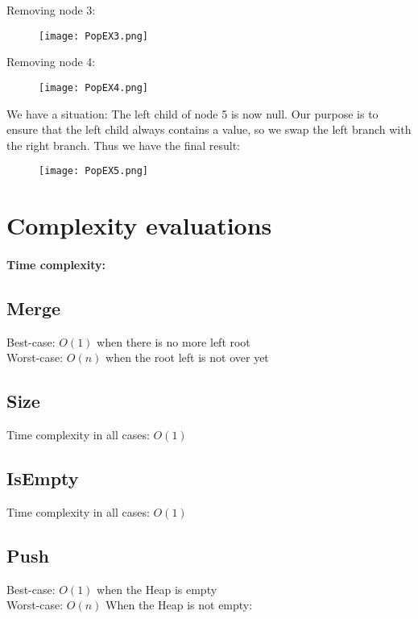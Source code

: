 \documentclass[12pt, a4paper]{article}
\newcommand\tab[1][0.5cm]{\hspace*{#1}}
\begin{document}
Removing node 3:
\begin{figure}[H]
    \begin{center}
        \texttt{[image: PopEX3.png]}
    \end{center}
\end{figure}
Removing node 4:
\begin{figure}[H]
    \begin{center}
        \texttt{[image: PopEX4.png]}
    \end{center}
\end{figure}
We have a situation:
The left child of node 5 is now null. Our purpose is to ensure that the left child always contains a value, so we swap the left branch with the right branch.
Thus we have the final result:
\begin{figure}[H]
    \begin{center}
        \texttt{[image: PopEX5.png]}
    \end{center}
\end{figure}

\section{Complexity evaluations}

\paragraph{\tab Time complexity:}

\subsection{Merge}
Best-case: $O(1)$ when there is no more left root\\
Worst-case: $O(n)$ when the root left is not over yet


\subsection{Size}
Time complexity in all cases: $O(1)$


\subsection{IsEmpty}
Time complexity in all cases: $O(1)$


\subsection{Push}
Best-case: $O(1)$ when the Heap is empty\\
Worst-case: $O(n)$ When the Heap is not empty:
\end{document}

